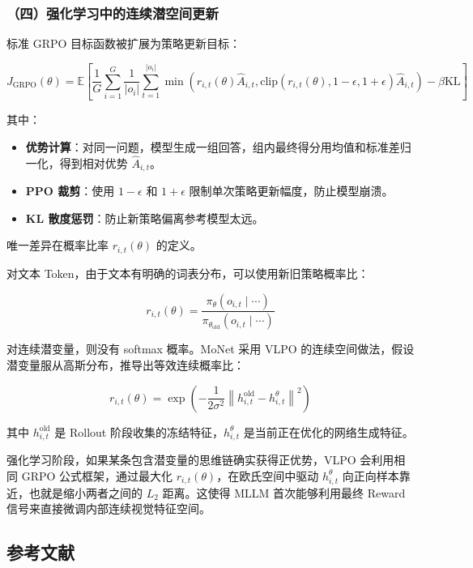 \hypertarget{ux56dbux5f3aux5316ux5b66ux4e60ux4e2dux7684ux8fdeux7eedux6f5cux7a7aux95f4ux66f4ux65b0}{%
\subsubsection{（四）强化学习中的连续潜空间更新}\label{ux56dbux5f3aux5316ux5b66ux4e60ux4e2dux7684ux8fdeux7eedux6f5cux7a7aux95f4ux66f4ux65b0}}

标准 GRPO 目标函数被扩展为策略更新目标：

\[
J_{\text{GRPO}}(\theta) =
\mathbb{E}\left[
\frac{1}{G}\sum_{i=1}^{G}\frac{1}{|o_i|}
\sum_{t=1}^{|o_i|}
\min\left(
r_{i,t}(\theta)\hat A_{i,t},
\mathrm{clip}(r_{i,t}(\theta),1-\epsilon,1+\epsilon)\hat A_{i,t}
\right)
-\beta\mathrm{KL}
\right]
\]

其中：

\begin{itemize}
\tightlist
\item
  \textbf{优势计算}：对同一问题，模型生成一组回答，组内最终得分用均值和标准差归一化，得到相对优势 \(\hat A_{i,t}\)。
\item
  \textbf{PPO 裁剪}：使用 \(1-\epsilon\) 和 \(1+\epsilon\) 限制单次策略更新幅度，防止模型崩溃。
\item
  \textbf{KL 散度惩罚}：防止新策略偏离参考模型太远。
\end{itemize}

唯一差异在概率比率 \(r_{i,t}(\theta)\) 的定义。

对文本 Token，由于文本有明确的词表分布，可以使用新旧策略概率比：

\[
r_{i,t}(\theta) =
\frac{\pi_{\theta}(o_{i,t}\mid\cdots)}
{\pi_{\theta_{\text{old}}}(o_{i,t}\mid\cdots)}
\]

对连续潜变量，则没有 softmax 概率。MoNet 采用 VLPO 的连续空间做法，假设潜变量服从高斯分布，推导出等效连续概率比：

\[
r_{i,t}(\theta) =
\exp\left(
-\frac{1}{2\sigma^2}
\left\lVert h_{i,t}^{\text{old}}-h_{i,t}^{\theta}\right\rVert^2
\right)
\]

其中 \(h_{i,t}^{\text{old}}\) 是 Rollout 阶段收集的冻结特征，\(h_{i,t}^{\theta}\) 是当前正在优化的网络生成特征。

强化学习阶段，如果某条包含潜变量的思维链确实获得正优势，VLPO 会利用相同 GRPO 公式框架，通过最大化 \(r_{i,t}(\theta)\)，在欧氏空间中驱动 \(h_{i,t}^{\theta}\) 向正向样本靠近，也就是缩小两者之间的 \(L_2\) 距离。这使得 MLLM 首次能够利用最终 Reward 信号来直接微调内部连续视觉特征空间。

\hypertarget{ux53c2ux8003ux6587ux732e-199}{%
\subsection{参考文献}\label{ux53c2ux8003ux6587ux732e-199}}

